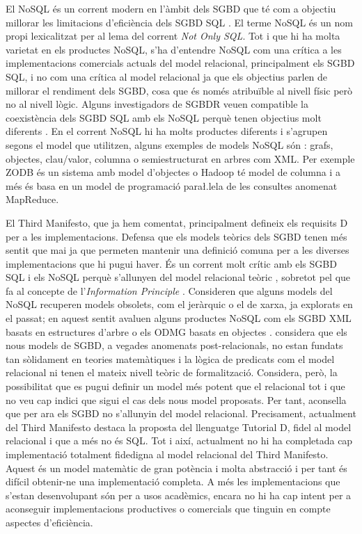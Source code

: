El NoSQL és un corrent modern en l'àmbit dels SGBD que té com a
objectiu millorar les limitacions d'eficiència dels SGBD
SQL \parencite{edlich:nosql,stonebraker10}. El terme NoSQL és un nom
propi lexicalitzat per al lema del corrent \emph{Not Only SQL}.  Tot i
que hi ha molta varietat en els productes NoSQL, s'ha d'entendre NoSQL
com una crítica a les implementacions comercials actuals del model
relacional, principalment els SGBD SQL, i no com una crítica al model
relacional ja que els objectius parlen de millorar el rendiment dels
SGBD, cosa que és només atribuïble al nivell físic però no al nivell
lògic.  Alguns investigadors de SGBDR veuen compatible la coexistència
dels SGBD SQL amb els NoSQL perquè tenen objectius molt diferents
\parencite{atzeni13:relational_model_dead}.  En el corrent NoSQL hi ha
molts productes diferents i s'agrupen segons el model que utilitzen,
alguns exemples de models NoSQL són \parencite{edlich:nosql}: grafs, 
objectes, clau/valor, columna o semiestructurat en arbres com XML.
Per exemple ZODB \parencite{zodb} és un sistema amb model d'objectes o
Hadoop \parencite{hadoop} té model de columna i a més és basa en un
model de programació para\l.lela de les consultes anomenat
MapReduce. %


El Third Manifesto, que ja hem comentat, principalment defineix els
requisits D per a les implementacions. Defensa que els models teòrics
dels SGBD tenen més sentit que mai ja que permeten mantenir una
definició comuna per a les diverses implementacions que hi pugui
haver.  És un corrent molt crític amb els SGBD SQL i els NoSQL perquè
s'allunyen del model relacional
teòric \parencite{datedarwen13:notosql_notonosql}, sobretot pel que fa
al concepte de l'\emph{Information Principle} \parencite[part
7]{date06}. Consideren que alguns models del NoSQL recuperen models
obsolets, com el jeràrquic o el de xarxa, ja explorats en el passat;
en aquest sentit avaluen alguns productes NoSQL com els SGBD XML
basats en estructures
d'arbre \parencite[cap.~14]{date06} \parencite[cap.~27]{date04:introduction8}
o els ODMG basats en objectes \parencite[cap.~27]{date06}.
\textcite[cap.~21--25]{date06} considera que els nous models de SGBD,
a vegades anomenats post-relacionals, no estan fundats tan sòlidament
en teories matemàtiques i la lògica de predicats com el model
relacional ni tenen el mateix nivell teòric de
formalització. %
Considera, però, la possibilitat que es pugui definir un model més
potent que el relacional tot i que no veu cap indici que sigui el cas
dels nous model proposats. Per tant, aconsella que per ara els SGBD no
s'allunyin del model relacional. %
Precisament, actualment del Third Manifesto destaca la proposta del
llenguatge Tutorial D, fidel al model relacional i que a més no és
SQL. Tot i així, actualment no hi ha completada cap implementació
totalment fidedigna al model relacional del Third Manifesto. Aquest és
un model matemàtic de gran potència i molta abstracció i per tant és
difícil obtenir-ne una implementació completa. A més les
implementacions que s'estan desenvolupant són per a usos acadèmics,
encara no hi ha cap intent per a aconseguir implementacions
productives o comercials que tinguin en compte aspectes d'eficiència.




